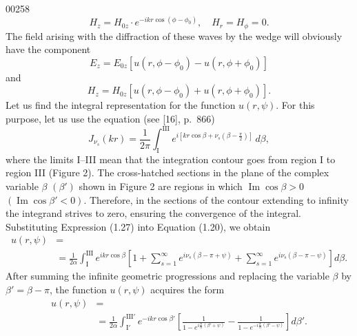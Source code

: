 \begin{scanpage}{0025}{8}
\[H_z=H_{0z}\cdot e^{-ikr\cos(\phi-\phi_0)},\quad H_r=H_\phi=0.\tag{1.24}\]
The field arising with the diffraction of these waves by the wedge will obviously have the component
\[E_z=E_{0z}[u(r,\phi-\phi_0)-u(r,\phi+\phi_0)]\tag{1.25}\]
and
\[H_z=H_{0z}[u(r,\phi-\phi_0)+u(r,\phi+\phi_0)].\tag{1.26}\]
Let us find the integral representation for the function $u(r,\psi)$. For this purpose, let us use the equation (see [16], p.\ 866)
\[J_{\nu_s}(kr)=\frac1{2\pi}\int_{\mathrm I}^{\mathrm{III}}e^{i[kr\cos\beta+\nu_s(\beta-\frac\pi2)]}\,d\beta,\tag{1.27}\]
where the limits I--III mean that the integration contour goes from region I to region III (Figure 2). The cross-hatched sections in the plane of the complex variable $\beta$ $(\beta')$ shown in Figure 2 are regions in which $\operatorname{Im}\cos\beta>0$ $(\operatorname{Im}\cos\beta'<0)$. Therefore, in the sections of the contour extending to infinity the integrand strives to zero, ensuring the convergence of the integral. Substituting Expression (1.27) into Equation (1.20), we obtain
\[\begin{aligned}u(r,\psi)&=\\&=\frac1{2\alpha}\int_{\mathrm I}^{\mathrm{III}}e^{ikr\cos\beta}\left[1+\sum_{s=1}^{\infty}e^{i\nu_s(\beta-\pi+\psi)}+\sum_{s=1}^{\infty}e^{i\nu_s(\beta-\pi-\psi)}\right]d\beta.\end{aligned}\]
After summing the infinite geometric progressions and replacing the variable $\beta$ by $\beta'=\beta-\pi$, the function $u(r,\psi)$ acquires the form
\[\begin{aligned}u(r,\psi)&=\\&=\frac1{2\alpha}\int_{\mathrm I'}^{\mathrm{III}'}e^{-ikr\cos\beta'}\left[\frac1{1-e^{i\frac\pi\alpha(\beta'+\psi)}}-\frac1{1-e^{-i\frac\pi\alpha(\beta'-\psi)}}\right]d\beta'.\end{aligned}\]
\end{scanpage}

